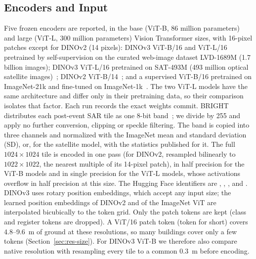 \documentclass{ieeeaccess}
\begin{document}
\subsection{Encoders and Input}
{\sloppy Five frozen encoders are reported, in the base (ViT-B, 86 million parameters) and large (ViT-L, 300 million parameters) Vision Transformer sizes, with 16-pixel patches except for DINOv2 (14 pixels): DINOv3 ViT-B/16 and ViT-L/16 pretrained by self-supervision on the curated web-image dataset LVD-1689M (1.7 billion images); DINOv3 ViT-L/16 pretrained on SAT-493M (493 million optical satellite images)~\cite{simeoni2026dinov3}; DINOv2 ViT-B/14~\cite{oquab2024dinov2}; and a supervised ViT-B/16 pretrained on ImageNet-21k and fine-tuned on ImageNet-1k~\cite{dosovitskiy2021vit}. The two ViT-L models have the same architecture and differ only in their pretraining data, so their comparison isolates that factor. Each run records the exact weights commit. BRIGHT distributes each post-event SAR tile as one 8-bit band~\cite{chen2025bright}; we divide by 255 and apply no further conversion, clipping or speckle filtering. The band is copied into three channels and normalized with the ImageNet mean and standard deviation (SD), or, for the satellite model, with the statistics published for it. The full $1024\times1024$ tile is encoded in one pass (for DINOv2, resampled bilinearly to $1022\times1022$, the nearest multiple of its 14-pixel patch), in half precision for the ViT-B models and in single precision for the ViT-L models, whose activations overflow in half precision at this size. The Hugging Face identifiers are , , ,  and . DINOv3 uses rotary position embeddings, which accept any input size; the learned position embeddings of DINOv2 and of the ImageNet ViT are interpolated bicubically to the token grid. Only the patch tokens are kept (class and register tokens are dropped). A ViT/16 patch token (token for short) covers 4.8--9.6~m of ground at these resolutions, so many buildings cover only a few tokens (Section~\ref{sec:res-size}). For DINOv3 ViT-B we therefore also compare native resolution with resampling every tile to a common 0.3~m before encoding.\par}
\end{document}
